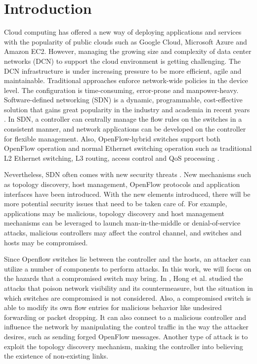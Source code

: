 \documentclass[conference]{IEEEtran}
\begin{document}
\section{Introduction}
\label{chap:intro}
Cloud computing has offered a new way of deploying applications and services with the popularity of public clouds such as Google Cloud, Microsoft Azure and Amazon EC2. However, managing the growing size and complexity of data center networks (DCN) to support the cloud environment is getting challenging. The DCN infrastructure is under increasing pressure to be more efficient, agile and maintainable. Traditional approaches enforce network-wide policies in the device level. The configuration is time-consuming, error-prone and manpower-heavy. Software-defined networking (SDN) is a dynamic, programmable, cost-effective solution that gains great popularity in the industry and academia in recent years \cite{KRVRAU15, MABPPRST08, LHM10}. In SDN, a controller can centrally manage the flow rules on the switches in a consistent manner, and network applications can be developed on the controller for flexible management. Also, OpenFlow-hybrid switches support both OpenFlow operation and normal Ethernet switching operation such as traditional L2 Ethernet switching, L3 routing, access control and QoS processing \cite{OF_SPEC}.

Nevertheless, SDN often comes with new security threats \cite{SOS13,CM}. New mechanisms such as topology discovery, host management, OpenFlow protocols and application interfaces have been introduced. With the new elements introduced, there will be more potential security issues that need to be taken care of. For example, applications may be malicious, topology discovery and host management mechanisms can be leveraged to launch man-in-the-middle or denial-of-service attacks, malicious controllers may affect the control channel, and switches and hosts may be compromised.

Since Openflow switches lie between the controller and the hosts, an attacker can utilize a number of components to perform attacks. In this work, we will focus on the hazards that a compromised switch may bring. In \cite{HXWG15}, Hong et al. studied the attacks that poison network visibility and its countermeasure, but the situation in which switches are compromised is not considered. Also, a compromised switch is able to modify its own flow entries for malicious behavior like undesired forwarding or packet dropping. It can also connect to a malicious controller and influence the network by manipulating the control traffic in the way the attacker desires, such as sending forged OpenFlow messages. Another type of attack is to exploit the topology discovery mechanism, making the controller into believing the existence of non-existing links.
\end{document}
